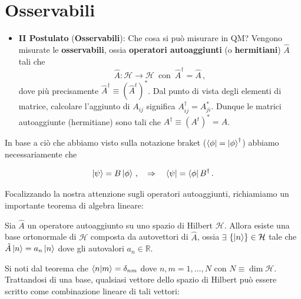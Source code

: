 \newpage
\noindent {}

\section{Osservabili}\label{sec:osservabili}

\begin{itemize}
    \item \textbf{II Postulato} (\textbf{Osservabili}): Che cosa si può misurare in QM? Vengono misurate le \textbf{osservabili}, ossia \textbf{operatori autoaggiunti} (o \textbf{hermitiani}) $\hat{A}$ tali che
    \begin{equation*}
        \hat{A}: \mathcal{H}\rightarrow \mathcal{H} \, \text{ con } \, \hat{A}^\dagger = \hat{A} \, ,
    \end{equation*}
    dove più precisamente $\hat{A}^\dagger \equiv (\hat{A}^t)^\ast$. Dal punto di vista degli elementi di matrice, calcolare l'aggiunto di $A_{ij}$ significa $A^\dagger_{ij} = A^\ast_{ji}$. Dunque le matrici autoaggiunte (hermitiane) sono tali che $A^\dagger \equiv (A^t)^\ast = A$.  
\end{itemize}

\noindent In base a ciò che abbiamo visto sulla notazione braket  ($\bra{\phi} = \ket{\phi}^\dagger$) abbiamo necessariamente che

\begin{equation*}
    \ket{\psi} = B \ket{\phi} \, , \quad \Rightarrow \quad  \bra{\psi} = \bra{\phi} B^\dagger \, .
\end{equation*}

\noindent Focalizzando la nostra attenzione sugli operatori autoaggiunti, richiamiamo un importante teorema di algebra lineare:
\begin{teorema}
    Sia $\hat{A}$ un operatore autoaggiunto su uno spazio di Hilbert $\mathcal{H}$. Allora esiste una base ortonormale di $\mathcal{H}$ composta da autovettori di $\hat{A}$, ossia $\exists$ $\lbrace \ket{n} \rbrace \in \mathcal{H}$ tale che $\hat{A} \ket{n} = a_n \ket{n}$ dove gli autovalori $a_n \in \mathbb{R}$.
\end{teorema}

\noindent Si noti dal teorema che $\braket{n}{m} = \delta_{nm}$ dove $n,m = 1, \ldots, N$ con $N \equiv \dim \mathcal{H}$. Trattandosi di una base, qualsiasi vettore dello spazio di Hilbert può essere scritto come combinazione lineare di tali vettori: 

